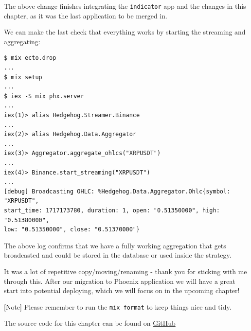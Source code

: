 \documentclass[
  oneside]{book}
\begin{document}
The above change finishes integrating the \texttt{indicator} app and the changes in this chapter, as it was the last application to be merged in.

We can make the last check that everything works by starting the streaming and aggregating:

\begin{verbatim}
$ mix ecto.drop
...
$ mix setup
...
$ iex -S mix phx.server
...
iex(1)> alias Hedgehog.Streamer.Binance
...
iex(2)> alias Hedgehog.Data.Aggregator
...
iex(3)> Aggregator.aggregate_ohlcs("XRPUSDT")
...
iex(4)> Binance.start_streaming("XRPUSDT")
...
[debug] Broadcasting OHLC: %Hedgehog.Data.Aggregator.Ohlc{symbol: "XRPUSDT",
start_time: 1717173780, duration: 1, open: "0.51350000", high: "0.51380000",
low: "0.51350000", close: "0.51370000"}
\end{verbatim}

The above log confirms that we have a fully working aggregation that gets broadcasted and could be stored in the database or used inside the strategy.

It was a lot of repetitive copy/moving/renaming - thank you for sticking with me through this. After our migration to Phoenix application we will have a great start into potential deploying, which we will focus on in the upcoming chapter!

{[}Note{]} Please remember to run the \texttt{mix\ format} to keep things nice and tidy.

The source code for this chapter can be found on \href{https://github.com/Cinderella-Man/hands-on-elixir-and-otp-cryptocurrency-trading-bot-source-code/tree/chapter_23}{GitHub}
\end{document}
